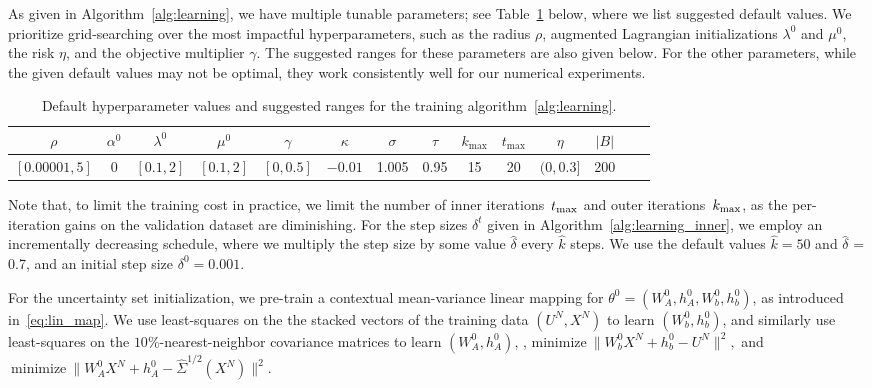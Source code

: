 \documentclass[11pt]{article}
\begin{document}
As given in Algorithm~\ref{alg:learning}, we have multiple tunable parameters; see Table~\ref{tab:default} below, where we list suggested default values.
We prioritize grid-searching over the most impactful hyperparameters, such as the radius $\rho$, augmented Lagrangian initializations $\lambda^0$ and $\mu^0$, the risk $\eta$, and the objective multiplier $\gamma$. The suggested ranges for these parameters are also given below. For the other parameters, while the given default values may not be optimal, they work consistently well for our numerical experiments.
\begin{table}[ht]
	\footnotesize
  \centering
	\begin{tabular}{cccccccccccccc}\toprule
	$\rho$& $\alpha^0$ & $\lambda^0$ & $\mu^0 $ & $\gamma$ &$\kappa$ & $\sigma$ & $\tau$ & $k_{\text{max}}$ & $t_{\text{max}}$ & $\eta$ & $|B|$\\
		\midrule
   $[0.00001,5]$ &0  & $[0.1,2]$ & $[0.1,2]$  & $[0,0.5]$ & $-0.01 $& 1.005 & 0.95 & 15 & 20 & $(0,0.3]$& 200\\
	\bottomrule
		\end{tabular}
		\caption{Default hyperparameter values and suggested ranges for the training algorithm~\ref{alg:learning}.}
		\label{tab:default}
        \ifpreprint\else
        \vspace{-1em}
        \fi
	\end{table}

Note that, to limit the training cost in practice, we limit the number of inner iterations~$t_{\rm max}$ and outer iterations~$k_{\rm max}$, as the per-iteration gains on the validation dataset are diminishing. 
For the step sizes $\delta^t$ given in Algorithm~\ref{alg:learning_inner}, we employ an incrementally decreasing schedule, where we multiply the step size by some value $\hat{\delta}$ every $\hat{k}$ steps. We use the default values $\hat{k} = 50$ and $\hat{\delta}$ = 0.7, and an initial step size $\delta^0 = 0.001$.

For the uncertainty set initialization, we pre-train a contextual mean-variance linear mapping for $\theta^0 = (W_A^0, h_A^0,W_b^0, h_b^0)$, as introduced in~\eqref{eq:lin_map}. We use least-squares on the the stacked vectors of the training data $(U^N,X^N)$ to learn $(W_b^0, h_b^0)$, and similarly use least-squares on the $10\%$-nearest-neighbor covariance matrices to learn $(W_A^0, h_A^0)$, \ie, 
$\text{minimize}~\|W_b^0X^N + h_b^0 - U^N\|^2,$ and$~\text{minimize}~\|W_A^0X^N + h_A^0 - \hat{\Sigma}^{1/2}(X^N)\|^2.$
\end{document}
